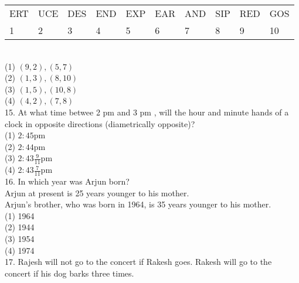 \documentclass[10pt]{article}
\begin{document}
\begin{center}
\begin{tabular}{llllllllll}\\
ERT & UCE & DES & END & EXP & EAR & AND & SIP & RED & GOS \\
1 & 2 & 3 & 4 & 5 & 6 & 7 & 8 & 9 & 10 
\end{tabular}
\end{center}
\\
(1) $(9,2),(5,7)$\\
(2) $(1,3),(8,10)$\\
(3) $(1,5),(10,8)$\\
(4) $(4,2),(7,8)$\\
15. At what time betwee 2 pm and 3 pm , will the hour and minute hands of a clock in opposite directions (diametrically opposite)?\\
(1) $2: 45 \mathrm{pm}$\\
(2) $2: 44 \mathrm{pm}$\\
(3) $2: 43 \frac{9}{11} \mathrm{pm}$\\
(4) $2: 43 \frac{7}{11} \mathrm{pm}$\\
16. In which year was Arjun born?\\

Arjun at present is 25 years younger to his mother.\\
Arjun's brother, who was born in 1964, is 35 years younger to his mother.\\
(1) 1964\\
(2) 1944\\
(3) 1954\\
(4) 1974\\
17. Rajesh will not go to the concert if Rakesh goes. Rakesh will go to the concert if his dog barks three times.\\
\end{document}
